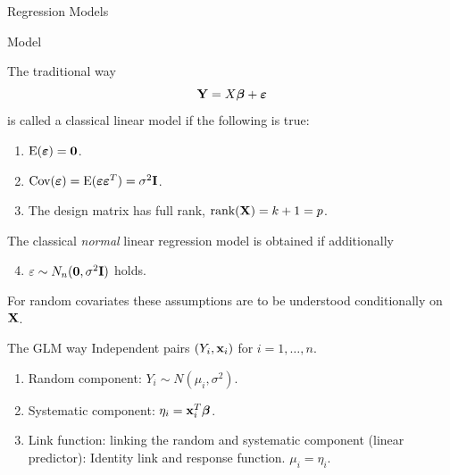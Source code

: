 \documentclass[
  ignorenonframetext,
]{beamer}
\providecommand{\tightlist}{%
  \setlength{\itemsep}{0pt}\setlength{\parskip}{0pt}}
\begin{document}
\begin{frame}{Regression Models}
\label{regression-models}
\end{frame}

\begin{frame}{Model}
\label{model}
\begin{block}{The traditional way}
\label{the-traditional-way}
\[{\bf Y}=X \boldsymbol{\beta}+\boldsymbol{\varepsilon}\] is called a
classical linear model if the following is true:

\begin{enumerate}
\item
  \(\text{E}(\boldsymbol{\varepsilon})=\bf{0}\).
\item
  \(\text{Cov}(\boldsymbol{\varepsilon})=\text{E}(\boldsymbol{\varepsilon}\boldsymbol{\varepsilon}^T)=\sigma^2\bf{I}\).
\item
  The design matrix has full rank, \(\text{rank}({\bf X})=k+1=p\).
\end{enumerate}

The classical \emph{normal} linear regression model is obtained if
additionally

\begin{enumerate}
\setcounter{enumi}{3}
\tightlist
\item
  \(\varepsilon\sim N_n({\bf{0}}, \sigma^2 \bf{I})\) holds.
\end{enumerate}

For random covariates these assumptions are to be understood
conditionally on \(\bf{X}\).
\end{block}
\end{frame}

\begin{frame}
\begin{block}{The GLM way}
\label{the-glm-way}
Independent pairs \((Y_i, {\bf x}_i)\) for \(i=1,\ldots,n\).

\begin{enumerate}
\tightlist
\item
  Random component: \(Y_i \sim N(\mu_i, \sigma^2)\).
\item
  Systematic component: \(\eta_i={\bf x}_i^T \boldsymbol{\beta}\).
\item
  Link function: linking the random and systematic component (linear
  predictor): Identity link and response function. \(\mu_i=\eta_i\).
\end{enumerate}
\end{block}
\end{frame}
\end{document}

